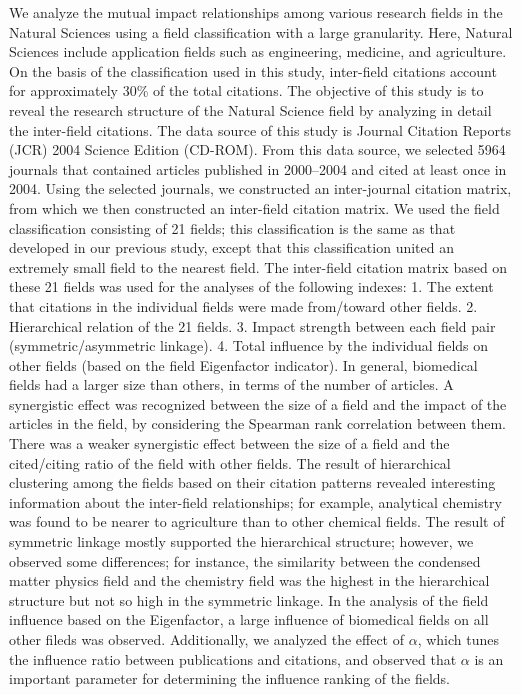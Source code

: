 %
We analyze the mutual impact relationships among various research fields in the Natural Sciences using a field classification with a large granularity.
Here, Natural Sciences include application fields such as engineering, medicine, and agriculture.
On the basis of the classification used in this study, inter-field citations account for approximately 30\% of the total citations.
The objective of this study is to reveal the research structure of the Natural Science field by analyzing in detail the inter-field citations.
The data source of this study is Journal Citation Reports (JCR) 2004 Science Edition (CD-ROM).
From this data source, we selected 5964 journals that contained articles published in 2000--2004 and cited at least once in 2004. Using the selected journals, we constructed an inter-journal citation matrix, from which we then constructed an inter-field citation matrix.
We used the field classification consisting of 21 fields; this classification is the same as that developed in our previous study, except that this classification united an extremely small field to the nearest field.
The inter-field citation matrix based on these 21 fields was used for the analyses of the following indexes:
1. The extent that citations in the individual fields were made from/toward other fields.
2. Hierarchical relation of the 21 fields.
3. Impact strength between each field pair (symmetric/asymmetric linkage).
4. Total influence by the individual fields on other fields (based on the field Eigenfactor indicator).
In general, biomedical fields had a larger size than others, in terms of the number of articles.
A synergistic effect was recognized between the size of a field and the impact of the articles in the field, by considering the Spearman rank correlation between them.
There was a weaker synergistic effect between the size of a field and the cited/citing ratio of the field with other fields.
The result of hierarchical clustering among the fields based on their citation patterns revealed interesting information about the inter-field relationships; for example, analytical chemistry was found to be nearer to agriculture than to other chemical fields.
The result of symmetric linkage mostly supported the hierarchical structure; however, we observed some differences; for instance, the similarity between the condensed matter physics field and the chemistry field was the highest in the hierarchical structure but not so high in the symmetric linkage.
In the analysis of the field influence based on the Eigenfactor, a large influence of biomedical fields on all other fileds was observed. Additionally, we analyzed the effect of $\alpha$, which tunes the influence ratio between publications and citations, and observed that $\alpha$ is an important parameter for determining the influence ranking of the fields.

%
